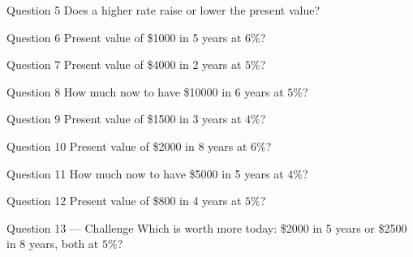 \documentclass[11pt]{article}
\begin{document}
\begin{qbox}{Question 5}
Does a higher rate raise or lower the present value?\workspace{2.4cm}
\end{qbox}

\begin{qbox}{Question 6}
Present value of \$1000 in 5 years at $6\%$?\workspace{2.4cm}
\end{qbox}

\begin{qbox}{Question 7}
Present value of \$4000 in 2 years at $5\%$?\workspace{2.4cm}
\end{qbox}

\begin{qbox}{Question 8}
How much now to have \$10000 in 6 years at $5\%$?\workspace{2.4cm}
\end{qbox}

\begin{qbox}{Question 9}
Present value of \$1500 in 3 years at $4\%$?\workspace{2.4cm}
\end{qbox}

\begin{qbox}{Question 10}
Present value of \$2000 in 8 years at $6\%$?\workspace{2.4cm}
\end{qbox}

\begin{qbox}{Question 11}
How much now to have \$5000 in 5 years at $4\%$?\workspace{2.4cm}
\end{qbox}

\begin{qbox}{Question 12}
Present value of \$800 in 4 years at $5\%$?\workspace{2.4cm}
\end{qbox}

\begin{qbox}{Question 13 --- Challenge}
Which is worth more today: \$2000 in 5 years or \$2500 in 8 years, both at $5\%$?\workspace{3.5cm}
\end{qbox}

\clearpage
{}
\end{document}
